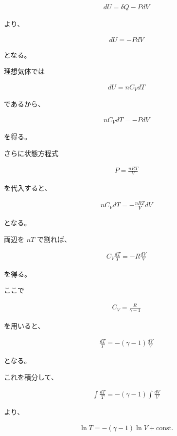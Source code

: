 \documentclass[platex,dvipdfmx,a4paper]{jsarticle}
\begin{document}
\begin{align*}
dU=\delta Q-PdV
\end{align*}

より、

\begin{align*}
dU=-PdV
\end{align*}

となる。

理想気体では

\begin{align*}
dU=nC_VdT
\end{align*}

であるから、

\begin{align*}
nC_VdT=-PdV
\end{align*}

を得る。

さらに状態方程式

\begin{align*}
P=\frac{nRT}{V}
\end{align*}

を代入すると、

\begin{align*}
nC_VdT
=
-\frac{nRT}{V}dV
\end{align*}

となる。

両辺を $nT$ で割れば、

\begin{align*}
C_V\frac{dT}{T}
=
-R\frac{dV}{V}
\end{align*}

を得る。

ここで

\begin{align*}
C_V=\frac{R}{\gamma-1}
\end{align*}

を用いると、

\begin{align*}
\frac{dT}{T}
=
-(\gamma-1)\frac{dV}{V}
\end{align*}

となる。

これを積分して、

\begin{align*}
\int \frac{dT}{T}
=
-(\gamma-1)
\int \frac{dV}{V}
\end{align*}

より、

\begin{align*}
\ln T
=
-(\gamma-1)\ln V+\mathrm{const.}
\end{align*}
\end{document}
